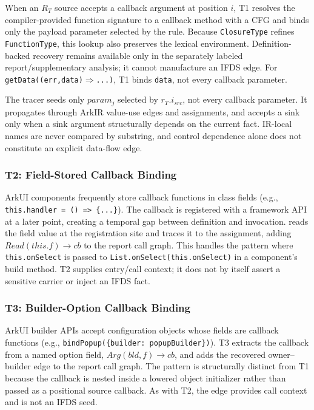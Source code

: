 When an $R_T$ source accepts a callback argument at position $i$, T1 resolves the compiler-provided function signature to a callback method with a CFG and binds only the payload parameter selected by the rule. Because \texttt{ClosureType} refines \texttt{FunctionType}, this lookup also preserves the lexical environment. Definition-backed recovery remains available only in the separately labeled report/supplementary analysis; it cannot manufacture an IFDS edge. For \texttt{getData((err,data)$\Rightarrow$...)}, T1 binds \texttt{data}, not every callback parameter.

The tracer seeds only $param_j$ selected by $r_T.i_{src}$, not every callback parameter. It propagates through ArkIR value-use edges and assignments, and accepts a sink only when a sink argument structurally depends on the current fact. IR-local names are never compared by substring, and control dependence alone does not constitute an explicit data-flow edge.

\subsubsection{T2: Field-Stored Callback Binding}

ArkUI components frequently store callback functions in class fields (e.g., \texttt{this.handler = () => \{...\}}). The callback is registered with a framework API at a later point, creating a temporal gap between definition and invocation. \mytool reads the field value at the registration site and traces it to the assignment, adding $Read(this.f)\to cb$ to the report call graph. This handles the pattern where \texttt{this.onSelect} is passed to \texttt{List.onSelect(this.onSelect)} in a component's build method. T2 supplies entry/call context; it does not by itself assert a sensitive carrier or inject an IFDS fact.

\subsubsection{T3: Builder-Option Callback Binding}

ArkUI builder APIs accept configuration objects whose fields are callback functions (e.g., \texttt{bindPopup(\{builder: popupBuilder\})}). T3 extracts the callback from a named option field, $Arg(bld,f)\to cb$, and adds the recovered owner--builder edge to the report call graph. The pattern is structurally distinct from T1 because the callback is nested inside a lowered object initializer rather than passed as a positional source callback. As with T2, the edge provides call context and is not an IFDS seed.

